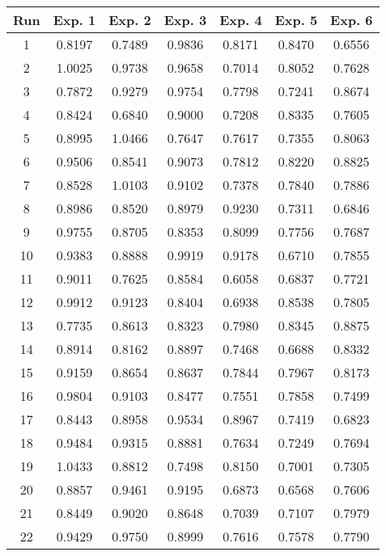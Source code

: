 \begin{table}
	\centering
	\begin{tabular}{ | c | c | c | c | c | c | c | }
		\hline
		Run & Exp. 1 & Exp. 2 & Exp. 3 & Exp. 4 & Exp. 5 & Exp. 6 \\ \hline
		1 & 0.8197 & 0.7489 & 0.9836 & 0.8171 & 0.8470 & 0.6556 \\ \hline
		2 & 1.0025 & 0.9738 & 0.9658 & 0.7014 & 0.8052 & 0.7628 \\ \hline
		3 & 0.7872 & 0.9279 & 0.9754 & 0.7798 & 0.7241 & 0.8674 \\ \hline
		4 & 0.8424 & 0.6840 & 0.9000 & 0.7208 & 0.8335 & 0.7605 \\ \hline
		5 & 0.8995 & 1.0466 & 0.7647 & 0.7617 & 0.7355 & 0.8063 \\ \hline
		6 & 0.9506 & 0.8541 & 0.9073 & 0.7812 & 0.8220 & 0.8825 \\ \hline
		7 & 0.8528 & 1.0103 & 0.9102 & 0.7378 & 0.7840 & 0.7886 \\ \hline
		8 & 0.8986 & 0.8520 & 0.8979 & 0.9230 & 0.7311 & 0.6846 \\ \hline
		9 & 0.9755 & 0.8705 & 0.8353 & 0.8099 & 0.7756 & 0.7687 \\ \hline
		10 & 0.9383 & 0.8888 & 0.9919 & 0.9178 & 0.6710 & 0.7855 \\ \hline
		11 & 0.9011 & 0.7625 & 0.8584 & 0.6058 & 0.6837 & 0.7721 \\ \hline
		12 & 0.9912 & 0.9123 & 0.8404 & 0.6938 & 0.8538 & 0.7805 \\ \hline
		13 & 0.7735 & 0.8613 & 0.8323 & 0.7980 & 0.8345 & 0.8875 \\ \hline
		14 & 0.8914 & 0.8162 & 0.8897 & 0.7468 & 0.6688 & 0.8332 \\ \hline
		15 & 0.9159 & 0.8654 & 0.8637 & 0.7844 & 0.7967 & 0.8173 \\ \hline
		16 & 0.9804 & 0.9103 & 0.8477 & 0.7551 & 0.7858 & 0.7499 \\ \hline
		17 & 0.8443 & 0.8958 & 0.9534 & 0.8967 & 0.7419 & 0.6823 \\ \hline
		18 & 0.9484 & 0.9315 & 0.8881 & 0.7634 & 0.7249 & 0.7694 \\ \hline
		19 & 1.0433 & 0.8812 & 0.7498 & 0.8150 & 0.7001 & 0.7305 \\ \hline
		20 & 0.8857 & 0.9461 & 0.9195 & 0.6873 & 0.6568 & 0.7606 \\ \hline
		21 & 0.8449 & 0.9020 & 0.8648 & 0.7039 & 0.7107 & 0.7979 \\ \hline
		22 & 0.9429 & 0.9750 & 0.8999 & 0.7616 & 0.7578 & 0.7790 \\ \hline

\end{tabular}
\end{table}
